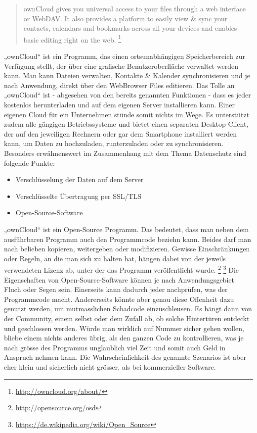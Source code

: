 \begin{quote}
ownCloud gives you universal access to your files through a web interface or WebDAV. It also provides a platform to easily view & sync your contacts, calendars and bookmarks across all your devices and enables basic editing right on the web.
\footnote{\url{http://owncloud.org/about/}}	
\end{quote}

„ownCloud“ ist ein Programm, das einen ortsunabhängigen Speicherbereich zur Verfügung stellt, der über eine grafische Benutzeroberfläche verwaltet werden kann. Man kann Dateien verwalten, Kontakte \& Kalender synchronisieren und je nach Anwendung, direkt über den WebBrowser Files editieren. Das Tolle an „ownCloud“ ist - abgesehen von den bereits genannten Funktionen - dass es jeder kostenlos herunterladen und auf dem eigenen Server installieren kann. Einer eigenen Cloud für ein Unternehmen stünde somit nichts im Wege. Es unterstützt zudem alle gängigen Betriebssysteme und bietet einen separaten Desktop-Client, der auf den jeweiligen Rechnern oder gar dem Smartphone installiert werden kann, um Daten zu hochzuladen, runterzuladen oder zu synchronisieren.
Besonders erwähnenswert im Zusammenhang mit dem Thema Datenschutz sind folgende Punkte:

\begin{itemize}
\item Verschlüsselung der Daten auf dem Server
\item Verschlüsselte Übertragung per SSL/TLS
\item Open-Source-Software
\end{itemize}

„ownCloud“ ist ein Open-Source Programm. Das bedeutet, dass man neben dem ausführbaren Programm auch den Programmcode beziehn kann. Beides darf man nach belieben kopieren, weitergeben oder modifizieren. Gewisse Einschränkungen oder Regeln, an die man sich zu halten hat, hängen dabei von der jeweils verwendeten Lizenz ab, unter der das Programm veröffentlicht wurde.
\footnote{\url{http://opensource.org/osd}} 
\footnote{\url{https://de.wikipedia.org/wiki/Open_Source}} 
Die Eigenschaften von Open-Source-Software können je nach Anwendungsgebiet Fluch oder Segen sein. Einerseits kann dadurch jeder nachprüfen, was der Programmcode macht. Andererseits könnte aber genau diese Offenheit dazu genutzt werden, um mutmasslichen Schadcode einzuschleusen. Es hängt dann von der Community, einem selbst oder dem Zufall ab, ob solche Hintertüren entdeckt und geschlossen werden. Würde man wirklich auf Nummer sicher gehen wollen, bliebe einem nichts anderes übrig, als den ganzen Code zu kontrollieren, was je nach grösse des Programms unglaublich viel Zeit und somit auch Geld in Anspruch nehmen kann. Die Wahrscheinlichkeit des genannte Szenarios ist aber eher klein und sicherlich nicht grösser, als bei kommerzieller Software.

